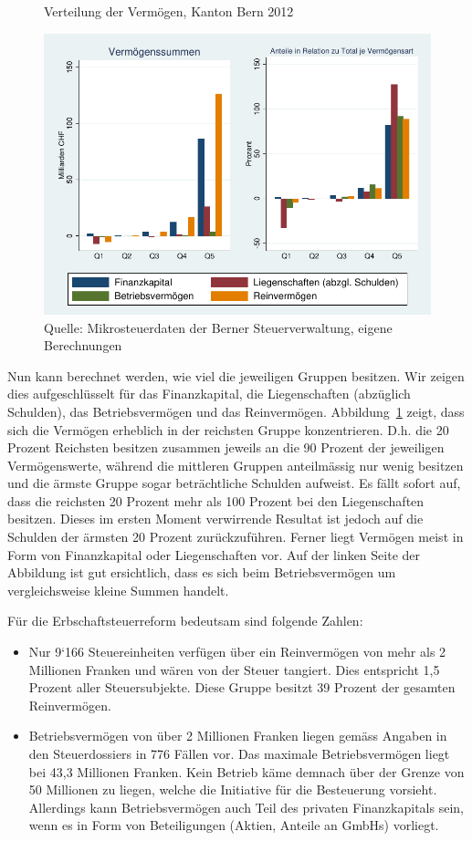 \documentclass[a4paper, 12pt,liststotoc]{scrartcl}
\numberwithin{equation}{section}
\begin{document}
\begin{figure}[!ht]
  \caption{Verteilung der Vermögen, Kanton Bern 2012}
  \label{fig:verteilung_vermoegen}
  \centering
    \includegraphics[width=\textwidth]{figure/VermoegenQuintil}
  \caption*{Quelle: Mikrosteuerdaten der Berner Steuerverwaltung, eigene Berechnungen}
\end{figure}

Nun kann berechnet werden, wie viel die jeweiligen Gruppen besitzen. Wir
zeigen dies aufgeschlüsselt für das Finanzkapital, die Liegenschaften
(abzüglich Schulden), das Betriebsvermögen und das Reinvermögen. Abbildung~\ref{fig:verteilung_vermoegen}
 zeigt, dass sich die Vermögen erheblich in der reichsten Gruppe
konzentrieren. D.h. die 20 Prozent Reichsten besitzen zusammen jeweils
an die 90 Prozent der jeweiligen Vermögenswerte, während die mittleren
Gruppen anteilmässig nur wenig besitzen und die ärmste Gruppe sogar
beträchtliche Schulden aufweist. Es fällt sofort auf, dass die reichsten
20 Prozent mehr als 100 Prozent bei den Liegenschaften besitzen. Dieses
im ersten Moment verwirrende Resultat ist jedoch auf die Schulden der
ärmsten 20 Prozent zurückzuführen. Ferner liegt Vermögen meist in Form von Finanzkapital oder
Liegenschaften vor. Auf der linken Seite der Abbildung ist gut ersichtlich,
dass es sich beim Betriebsvermögen um vergleichsweise kleine Summen
handelt.

Für die Erbschaftsteuerreform bedeutsam sind folgende Zahlen:

\begin{itemize}
\item
  Nur 9`166 Steuereinheiten verfügen über ein Reinvermögen von mehr als
  2 Millionen Franken und wären von der Steuer tangiert. Dies entspricht
  1,5 Prozent aller Steuersubjekte. Diese Gruppe besitzt 39 Prozent der
  gesamten Reinvermögen.
\item
  Betriebsvermögen von über 2 Millionen Franken liegen gemäss Angaben in
  den Steuerdossiers in 776 Fällen vor. Das maximale Betriebsvermögen
  liegt bei 43,3 Millionen Franken. Kein Betrieb käme demnach über der
  Grenze von 50 Millionen zu liegen, welche die Initiative für die
  Besteuerung vorsieht. Allerdings kann Betriebsvermögen auch Teil des
  privaten Finanzkapitals sein, wenn es in Form von Beteiligungen
  (Aktien, Anteile an GmbHs) vorliegt.
\end{itemize}
\end{document}
